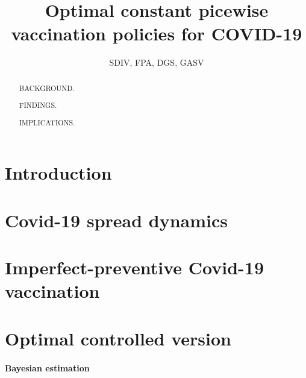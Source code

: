 \documentclass[a4paper,10pt, 5p]{elsarticle}
\begin{document}
    \author{SDIV, FPA, DGS, GASV}
    \title{Optimal constant picewise vaccination policies for COVID-19}
    \begin{abstract}
      
      BACKGROUND.

      FINDINGS.
      
      IMPLICATIONS.
    \end{abstract}
    \maketitle
    \section{Introduction}
      
    \section{Covid-19 spread dynamics}
      
    \section{Imperfect-preventive Covid-19 vaccination}
      
    \section{Optimal controlled version}
       

    \paragraph{Bayesian estimation}
\end{document}
